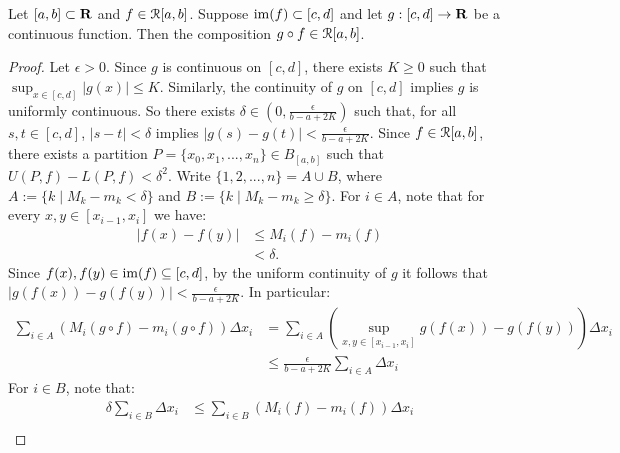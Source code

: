 \documentclass[11pt,twoside,openany]{memoir}
\begin{document}
    \begin{theorem}\label{thm:composition-of-inte}
        Let $[a,b] \subset \mathbf{R}$ and $f \in \mathcal{R}[a,b]$. Suppose $\operatorname{im}(f) \subset [c,d]$ and let $g:[c,d] \rightarrow \mathbf{R}$ be a continuous function. Then the composition $g \circ f \in \mathcal{R}[a,b]$.
    \end{theorem}
        \begin{proof}
            Let $\epsilon > 0$. Since $g$ is continuous on $[c,d]$, there exists $K \geq 0$ such that $\sup_{x \in [c,d]}|g(x)| \leq K$. Similarly, the continuity of $g$ on $[c,d]$ implies $g$ is uniformly continuous. So there exists $\delta \in \left(0, \frac{\epsilon}{b-a + 2K}\right)$ such that, for all $s,t \in [c,d]$, $|s-t| < \delta$ implies $|g(s)-g(t)| < \frac{\epsilon}{b-a + 2K}$.  Since $f \in \mathcal{R}[a,b]$, there exists a partition $P = \{x_0,x_1,...,x_n\} \in B_{[a,b]}$ such that $U(P,f) - L(P,f) < \delta^2$. Write $\{1,2,...,n\} = A \cup B$, where $A := \{k \mid M_k - m_k < \delta\}$ and $B := \{k \mid M_k - m_k \geq \delta\}$. For $i \in A$, note that for every $x,y \in [x_{i-1},x_i]$ we have:
                \begin{equation*}
                \begin{split}
                    |f(x) - f(y)|
                    & \leq M_i(f) - m_i(f) \\
                    & < \delta.
                \end{split}
                \end{equation*}
            Since $f(x),f(y) \in \operatorname{im}(f) \subseteq [c,d]$, by the uniform continuity of $g$ it follows that $|g(f(x)) - g(f(y))| < \frac{\epsilon}{b-a + 2K}$. In particular:
                \begin{equation*}
                \begin{split}
                    \sum_{i \in A}(M_i(g \circ f) - m_i(g \circ f))\Delta x_i 
                    & = \sum_{i \in A}\left(\sup_{x,y \in [x_{i-1},x_i]}g(f(x)) - g(f(y))\right)\Delta x_i \\
                    & \leq \frac{\epsilon}{b-a + 2K}\sum_{i \in A}\Delta x_i
                \end{split}
                \end{equation*}
            For $i \in B$, note that:
                \begin{equation*}
                \begin{split}
                    \delta\sum_{i \in B}\Delta x_i
                    & \leq \sum_{i \in B}(M_i(f) - m_i(f))\Delta x_i \\

\end{split}
\end{equation*}
\end{proof}
\end{document}
